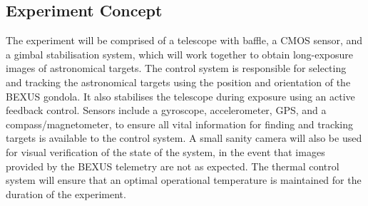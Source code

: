 \subsection{Experiment Concept}

The experiment will be comprised of a telescope with baffle, a CMOS sensor, and a gimbal stabilisation system, which will work together to obtain long-exposure images of astronomical targets. The control system is responsible for selecting and tracking the astronomical targets using the position and orientation of the BEXUS gondola. It also stabilises the telescope during exposure using an active feedback control. Sensors include a gyroscope, accelerometer, GPS, and a compass/magnetometer, to ensure all vital information for finding and tracking targets is available to the control system. A small sanity camera will also be used for visual verification of the state of the system, in the event that images provided by the BEXUS telemetry are not as expected. The thermal control system will ensure that an optimal operational temperature is maintained for the duration of the experiment.
